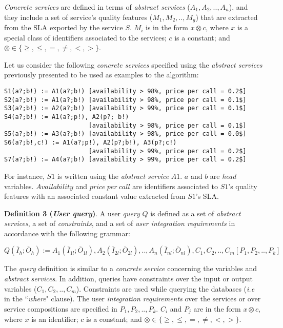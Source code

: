 \textit{Concrete services} are defined in terms of \textit{abstract services} ($A_{1}, A_{2}, .., A_{n}$), and they include a set of service's quality features ($M_{1},M_{2}, .., M_{g}$) that are extracted from the SLA exported by the service $S$.
$M_{i}$ is in the form $x \otimes c$, where $x$ is a special class of identifiers associated to the services; $c$ is a constant; and $\otimes \in\lbrace \geq, \leq, =, \neq, <, >\rbrace$. 

Let us consider the following \textit{concrete services} specified using the \textit{abstract services} previously presented to be used as examples to the algorithm: 

\begin{small}
\begin{verbatim}
S1(a?;b!) := A1(a?;b!) [availability > 98%, price per call = 0.2$]
S2(a?;b!) := A1(a?;b!) [availability > 98%, price per call = 0.1$]
S3(a?;b!) := A2(a?;b!) [availability > 99%, price per call = 0.1$]
S4(a?;b!) := A1(a?;p!), A2(p?; b!) 
                       [availability > 98%, price per call = 0.1$]
S5(a?;b!) := A3(a?;b!) [availability > 98%, price per call = 0.0$]
S6(a?;b!,c!) := A1(a?;p!), A2(p?;b!), A3(p?;c!) 
                       [availability > 99%, price per call = 0.2$]
S7(a?;b!) := A4(a?;b!) [availability > 99%, price per call = 0.2$]
\end{verbatim}
\end{small}
%
For instance, $S1$ is written using the \textit{abstract service} $A1$.
$a$ and $b$ are \textit{head} variables. 
$Availability$ and $price \ per \ call$ are identifiers associated to $S1$'s quality features with an associated constant value extracted from $S1$'s SLA.

\bigskip

\noindent \textbf{Definition 3 (\textit{User query})}.
A user \textit{query} $Q$ is defined as a set of \textit{abstract services}, a set of \textit{constraints}, and a set of \textit{user integration requirements} in accordance with the following grammar:
%
\begin{center}
\small
\begin{math}
Q (\overline{I}_{h}; \overline{O}_{h}) := A_{1}(\overline{I}_{1l};
\overline{O}_{1l}), A_{2}(\overline{I}_{2l}; \overline{O}_{2l}), ..,  A_{n}(\overline{I}_{nl}; \overline{O}_{nl}),C_{1},C_{2}, .., C_{m}[P_{1},P_{2}, .., P_{k}]
\end{math}
\end{center}
%
The \textit{query} definition is similar to a \textit{concrete service} concerning the variables and \textit{abstract services}. In addition, queries have constraints over the input or output variables ($C_{1}, C_{2}, .., C_{m}$). Constraints are used while querying the databases (\textit{i.e} in the ``\textit{where}" clause). The user \textit{integration requirements} over the services or over service compositions are specified in $P_{1}, P_{2}, .., P_{k}$. $C_{i}$ and $P_{j}$ are in the form $x \otimes c$, where $x$ is an identifier; $c$ is a constant; and $\otimes \in\lbrace \geq, \leq, =, \neq, <, >\rbrace$.

